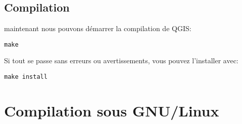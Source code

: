 % 
% 
% 
% 
% 
% 
% 

\subsection{Compilation}
maintenant nous pouvons démarrer la compilation de QGIS:

\begin{verbatim}
make 
\end{verbatim}

Si tout se passe sans erreurs ou avertissements, vous pouvez l'installer avec:

\begin{verbatim}
make install 
\end{verbatim}

\section{Compilation sous GNU/Linux}\label{sec:install_linux}

